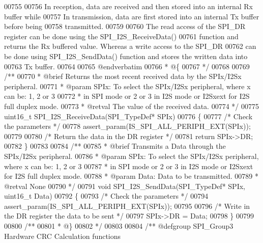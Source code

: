 \begin{DoxyCode}
00755 \textcolor{comment}{  }
00756 \textcolor{comment}{  In reception, data are received and then stored into an internal Rx buffer while }
00757 \textcolor{comment}{  In transmission, data are first stored into an internal Tx buffer before being }
00758 \textcolor{comment}{  transmitted.}
00759 \textcolor{comment}{}
00760 \textcolor{comment}{  The read access of the SPI\_DR register can be done using the SPI\_I2S\_ReceiveData()}
00761 \textcolor{comment}{  function and returns the Rx buffered value. Whereas a write access to the SPI\_DR }
00762 \textcolor{comment}{  can be done using SPI\_I2S\_SendData() function and stores the written data into }
00763 \textcolor{comment}{  Tx buffer.}
00764 \textcolor{comment}{}
00765 \textcolor{comment}{@endverbatim}
00766 \textcolor{comment}{  * @\{}
00767 \textcolor{comment}{  */}
00768 
00769 \textcolor{comment}{/**}
00770 \textcolor{comment}{  * @brief  Returns the most recent received data by the SPIx/I2Sx peripheral. }
00771 \textcolor{comment}{  * @param  SPIx: To select the SPIx/I2Sx peripheral, where x can be: 1, 2 or 3 }
00772 \textcolor{comment}{  *         in SPI mode or 2 or 3 in I2S mode or I2Sxext for I2S full duplex mode. }
00773 \textcolor{comment}{  * @retval The value of the received data.}
00774 \textcolor{comment}{  */}
00775 uint16\_t SPI_I2S_ReceiveData(SPI\_TypeDef* SPIx)
00776 \{
00777   \textcolor{comment}{/* Check the parameters */}
00778   assert_param(IS\_SPI\_ALL\_PERIPH\_EXT(SPIx));
00779 
00780   \textcolor{comment}{/* Return the data in the DR register */}
00781   \textcolor{keywordflow}{return} SPIx->DR;
00782 \}
00783 
00784 \textcolor{comment}{/**}
00785 \textcolor{comment}{  * @brief  Transmits a Data through the SPIx/I2Sx peripheral.}
00786 \textcolor{comment}{  * @param  SPIx: To select the SPIx/I2Sx peripheral, where x can be: 1, 2 or 3 }
00787 \textcolor{comment}{  *         in SPI mode or 2 or 3 in I2S mode or I2Sxext for I2S full duplex mode.     }
00788 \textcolor{comment}{  * @param  Data: Data to be transmitted.}
00789 \textcolor{comment}{  * @retval None}
00790 \textcolor{comment}{  */}
00791 \textcolor{keywordtype}{void} SPI_I2S_SendData(SPI\_TypeDef* SPIx, uint16\_t Data)
00792 \{
00793   \textcolor{comment}{/* Check the parameters */}
00794   assert_param(IS\_SPI\_ALL\_PERIPH\_EXT(SPIx));
00795 
00796   \textcolor{comment}{/* Write in the DR register the data to be sent */}
00797   SPIx->DR = Data;
00798 \}
00799 
00800 \textcolor{comment}{/**}
00801 \textcolor{comment}{  * @\}}
00802 \textcolor{comment}{  */}
00803 
00804 \textcolor{comment}{/** @defgroup SPI\_Group3 Hardware CRC Calculation functions}

\end{DoxyCode}
